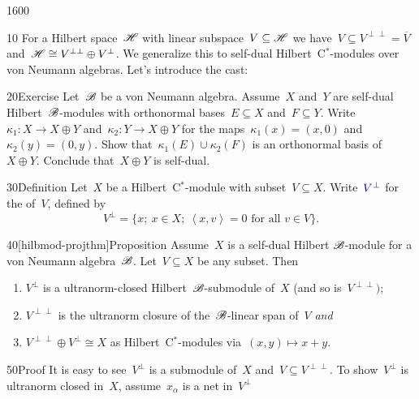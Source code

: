 \begin{parsec}{1600}%
\begin{point}{10}%
For a Hilbert space~$\mathscr{H}$
    with linear subspace~$V \subseteq \mathscr{H}$
    we have~$V \subseteq V^{\perp\perp} = \overline{V}$
    and~$\mathscr{H} \cong V^{\perp\perp} \oplus  V^\perp$.
We generalize this to self-dual Hilbert~C$^*$-modules
    over von Neumann algebras.
Let's introduce the cast:
\end{point}
\begin{point}{20}{Exercise}%
Let~$\mathscr{B}$ be a von Neumann algebra.
Assume~$X$ and~$Y$ are self-dual Hilbert~$\mathscr{B}$-modules
    with orthonormal bases~$E \subseteq X$ and~$F \subseteq Y$.
Write~$\kappa_1\colon X \to X \oplus Y$
    and~$\kappa_2 \colon Y \to X \oplus Y$
    for the maps~$\kappa_1(x) = (x,0)$ and~$\kappa_2(y) = (0, y)$.
Show that~$\kappa_1(E) \cup \kappa_2(F)$
    is an orthonormal basis of~$X \oplus Y$.
    Conclude that~$X \oplus Y$ is self-dual.
\end{point}
\begin{point}{30}{Definition}%
Let~$X$ be a Hilbert~C$^*$-module
    with subset~$V \subseteq X$.
    Write~$\Define{V^\perp}$ for the 
    of~$V$, defined by
\begin{equation*}
    V^\perp = \{ x; \ x \in X;\ \left<x,v\right>=0\text{ for all }v\in V\}.
\end{equation*}
\end{point}
\begin{point}{40}[hilbmod-projthm]{Proposition}%
Assume~$X$ is a self-dual Hilbert $\mathscr{B}$-module
    for a von Neumann algebra~$\mathscr{B}$.
Let~$V \subseteq X$ be any subset. Then
\begin{enumerate}
\item
$V^\perp$ is a ultranorm-closed Hilbert~$\mathscr{B}$-submodule of~$X$
    (and so is~$V^{\perp\perp})$;
\item
    $V^{\perp\perp}$ is the ultranorm closure of the~$\mathscr{B}$-linear
    span of~$V$ \emph{and}
\item
    $V^{\perp\perp} \oplus V^\perp \cong X$ as Hilbert~C$^*$-modules
        via~$(x,y) \mapsto x+y$.
\end{enumerate}
\begin{point}{50}{Proof}%
It is easy to see~$V^\perp$ is a submodule of~$X$
    and~$V \subseteq V^{\perp\perp}$.
To show~$V^\perp$ is ultranorm closed in~$X$,
    assume~$x_\alpha$ is a net in~$V^\perp$

\end{point}
\end{point}
\end{parsec}
